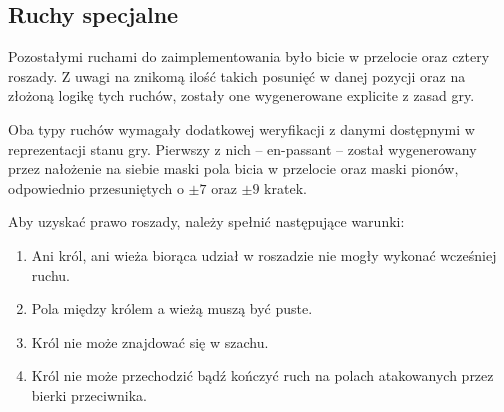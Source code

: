 \subsection{Ruchy specjalne}
\label{subsec:ruchy-specjalne}

Pozostałymi ruchami do zaimplementowania było bicie w przelocie oraz cztery roszady.
Z uwagi na znikomą ilość takich posunięć w danej pozycji oraz na złożoną logikę tych ruchów, zostały one wygenerowane explicite z zasad gry.

Oba typy ruchów wymagały dodatkowej weryfikacji z danymi dostępnymi w reprezentacji stanu gry.
Pierwszy z nich – en-passant – został wygenerowany przez nałożenie na siebie maski pola bicia w przelocie oraz maski pionów, odpowiednio przesuniętych o $\pm 7$ oraz $\pm 9$ kratek.

Aby uzyskać prawo roszady, należy spełnić następujące warunki:
\begin{enumerate}
    \item Ani król, ani wieża biorąca udział w roszadzie nie mogły wykonać wcześniej ruchu.
    \item Pola między królem a wieżą muszą być puste.
    \item Król nie może znajdować się w szachu.
    \item Król nie może przechodzić bądź kończyć ruch na polach atakowanych przez bierki przeciwnika.
\end{enumerate}



